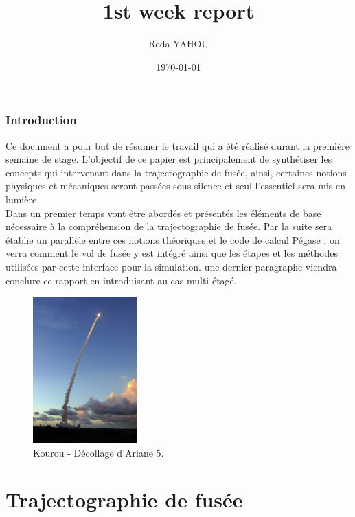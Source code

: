 \documentclass[a4paper]{article}
\title{1st week report}
\author{Reda YAHOU}
\date{\today}
\begin{document}
\maketitle

\section*{Introduction}

Ce document a pour but de résumer le travail qui a été réalisé durant la première semaine de stage. L'objectif de ce papier est principalement de synthétiser les concepts qui intervenant dans la trajectographie de fusée, ainsi, certaines notions physiques et mécaniques seront passées sous silence et seul l'essentiel sera mis en lumière.\\

Dans un premier temps vont être abordés et présentés les éléments de base nécessaire à la compréhension de la trajectographie de fusée. Par la suite sera établie un parallèle entre ces notions théoriques et le code de calcul Pégase : on verra comment le vol de fusée y est intégré ainsi que les étapes et les méthodes utilisées par cette interface pour la simulation. une dernier paragraphe viendra conclure ce rapport en introduisant au cas multi-étagé.\\


\begin{figure}[!htbp]
\begin{center}
\includegraphics[width=4cm]{Kourou---Decollage-Ariane-5---V184.jpg} 
\end{center}
\caption{Kourou - Décollage d'Ariane 5.}
\end{figure}



\part{Trajectographie de fusée}
\end{document}
